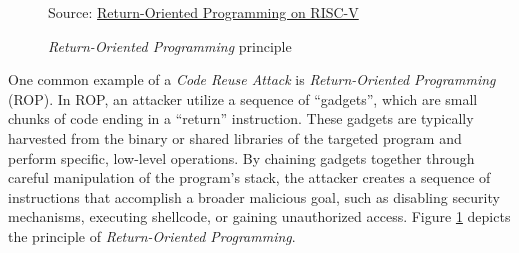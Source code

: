 \begin{figure}
  \centering
  \def\stackalignment{r} %
  {\scriptsize \parbox[t]{\linewidth}{Source: \href{http://dx.doi.org/10.1145/3320269.3384738}{Return-Oriented Programming on RISC-V}\cite{rop}}}
  \caption{\textit{Return-Oriented Programming} principle}
  \label{fig:rop}
\end{figure}

One common example of a \textit{Code Reuse Attack} is \textit{Return-Oriented
Programming} (ROP). In ROP, an attacker utilize a sequence of ``gadgets'', which
are small chunks of code ending in a ``return'' instruction. These gadgets are typically
harvested from the binary or shared libraries of the targeted program and perform
specific, low-level operations. By chaining gadgets together through careful manipulation
of the program's stack, the attacker creates a sequence of instructions that
accomplish a broader malicious goal, such as disabling security mechanisms,
executing shellcode, or gaining unauthorized access. Figure \ref{fig:rop}
depicts the principle of \textit{Return-Oriented Programming}.


